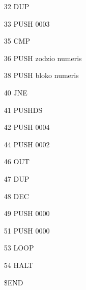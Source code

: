\documentclass{scrartcl}
\begin{document}
\begin{itemize}
				\item [32] DUP
				\item [33] PUSH 0003
				\item [35] CMP		
				\item [36] PUSH zodzio numeris
				\item [38] PUSH bloko numeris								
				\item [40] JNE 		
				\item [41] PUSHDS
				\item [42] PUSH 0004
				\item [44] PUSH 0002
				\item [46] OUT
				
				\item [47] DUP
				\item [48] DEC
				\item [49] PUSH 0000
				\item [51] PUSH 0000
				\item [53] LOOP
				\item [54] HALT				
				\item[] \$END
			\end{itemize}
		
\end{document}
